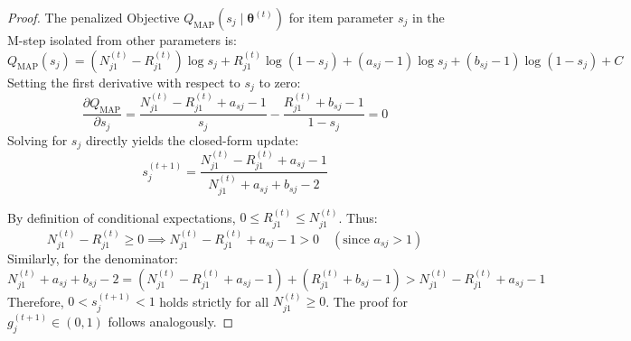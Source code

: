\documentclass[11pt,a4paper]{article}
\begin{document}
\begin{proof}
The penalized Objective $Q_{\text{MAP}}(s_j \mid \boldsymbol{\theta}^{(t)})$ for item parameter $s_j$ in the M-step isolated from other parameters is:
\begin{equation}
Q_{\text{MAP}}(s_j) = (N_{j1}^{(t)} - R_{j1}^{(t)}) \log s_j + R_{j1}^{(t)} \log(1 - s_j) + (a_{sj} - 1) \log s_j + (b_{sj} - 1) \log(1 - s_j) + C
\end{equation}
Setting the first derivative with respect to $s_j$ to zero:
\begin{equation}
\frac{\partial Q_{\text{MAP}}}{\partial s_j} = \frac{N_{j1}^{(t)} - R_{j1}^{(t)} + a_{sj} - 1}{s_j} - \frac{R_{j1}^{(t)} + b_{sj} - 1}{1 - s_j} = 0
\end{equation}
Solving for $s_j$ directly yields the closed-form update:
\begin{equation}
s_j^{(t+1)} = \frac{N_{j1}^{(t)} - R_{j1}^{(t)} + a_{sj} - 1}{N_{j1}^{(t)} + a_{sj} + b_{sj} - 2}
\end{equation}

By definition of conditional expectations, $0 \le R_{j1}^{(t)} \le N_{j1}^{(t)}$. Thus:
\begin{equation}
N_{j1}^{(t)} - R_{j1}^{(t)} \ge 0 \implies N_{j1}^{(t)} - R_{j1}^{(t)} + a_{sj} - 1 > 0 \quad (\text{since } a_{sj} > 1)
\end{equation}
Similarly, for the denominator:
\begin{equation}
N_{j1}^{(t)} + a_{sj} + b_{sj} - 2 = (N_{j1}^{(t)} - R_{j1}^{(t)} + a_{sj} - 1) + (R_{j1}^{(t)} + b_{sj} - 1) > N_{j1}^{(t)} - R_{j1}^{(t)} + a_{sj} - 1
\end{equation}
Therefore, $0 < s_j^{(t+1)} < 1$ holds strictly for all $N_{j1}^{(t)} \ge 0$. The proof for $g_j^{(t+1)} \in (0,1)$ follows analogously.
\end{proof}
\end{document}
